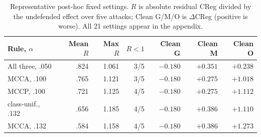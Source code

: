 \begin{table}[H]
\centering
\caption{Representative post-hoc fixed settings. $R$ is absolute residual CReg divided by the undefended effect over five attacks; Clean G/M/O is $\Delta$CReg (positive is worse). All 21 settings appear in the appendix.}
\label{tab:soft-weight}
\scriptsize
\setlength{\tabcolsep}{2.4pt}
\begin{tabular*}{\linewidth}{@{\extracolsep{\fill}}lrrrrrr@{}}
\toprule
Rule, $\alpha$ & Mean $R$ & Max $R$ & $R<1$ & Clean G & Clean M & Clean O \\
\midrule
All three, .050  & .824 & 1.061 & 3/5 & $-0.180$ & $+0.351$ & $+0.238$ \\
MCCA, .100       & .765 & 1.121 & 3/5 & $-0.180$ & $+0.275$ & $+1.018$ \\
MCCP, .100       & .721 & 1.125 & 4/5 & $-0.180$ & $+0.275$ & $+1.112$ \\
class-unif., .132& .656 & 1.185 & 4/5 & $-0.180$ & $+0.386$ & $+1.110$ \\
MCCA, .132       & .584 & 1.158 & 4/5 & $-0.180$ & $+0.386$ & $+1.273$ \\
\bottomrule
\end{tabular*}
\end{table}
